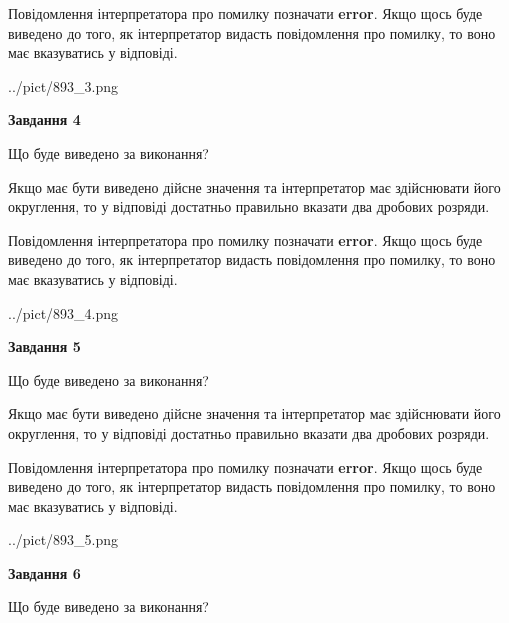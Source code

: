 \documentclass[12pt, ukrainian]{article}
\begin{document}
{\begin {Large}
Повідомлення інтерпретатора про помилку позначати \textbf{error}.
Якщо щось буде виведено до того, як інтерпретатор видасть повідомлення про помилку, 
то воно має вказуватись у відповіді. \par

\begin{center}
	{../pict/893_3.png}
\end{center}
\newpage

{\begin {center}\textbf{Завдання 4}\end {center}}\par
Що буде виведено за виконання? \par

Якщо має бути виведено дійсне значення та інтерпретатор має здійснювати його округлення, 
то у відповіді достатньо правильно вказати два дробових розряди.

Повідомлення інтерпретатора про помилку позначати \textbf{error}.
Якщо щось буде виведено до того, як інтерпретатор видасть повідомлення про помилку, 
то воно має вказуватись у відповіді. \par

\begin{center}
	{../pict/893_4.png}
\end{center}
\newpage

{\begin {center}\textbf{Завдання 5}\end {center}}\par
Що буде виведено за виконання? \par

Якщо має бути виведено дійсне значення та інтерпретатор має здійснювати його округлення, 
то у відповіді достатньо правильно вказати два дробових розряди.

Повідомлення інтерпретатора про помилку позначати \textbf{error}.
Якщо щось буде виведено до того, як інтерпретатор видасть повідомлення про помилку, 
то воно має вказуватись у відповіді. \par

\begin{center}
	{../pict/893_5.png}
\end{center}
\newpage

{\begin {center}\textbf{Завдання 6}\end {center}}\par
Що буде виведено за виконання? \par


\end{Large}}
\end{document}
